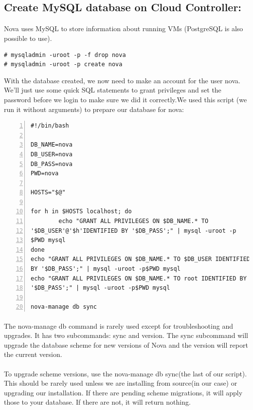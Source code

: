 \subsection{Create MySQL database on Cloud Controller:}
\paragraph{}Nova uses MySQL to store information about running VMs (PostgreSQL is also possible to use).


\begin{lstlisting}[language={[Latex]TeX}, frame=single]
# mysqladmin -uroot -p -f drop nova
# mysqladmin -uroot -p create nova
\end{lstlisting}
With the database created, we now need to make an account for the user nova. We’ll just use some quick SQL statements to grant privileges 
and set the password before we login to make sure we did it correctly.We used this script (we run it without arguments) to prepare our database for nova:

\begin{lstlisting}[language={[Latex]TeX}, numbers=left, frame=single]
#!/bin/bash

DB_NAME=nova
DB_USER=nova
DB_PASS=nova
PWD=nova

HOSTS="$@"

for h in $HOSTS localhost; do
        echo "GRANT ALL PRIVILEGES ON $DB_NAME.* TO 
'$DB_USER'@'$h'IDENTIFIED BY '$DB_PASS';" | mysql -uroot -p
$PWD mysql
done
echo "GRANT ALL PRIVILEGES ON $DB_NAME.* TO $DB_USER IDENTIFIED 
BY '$DB_PASS';" | mysql -uroot -p$PWD mysql
echo "GRANT ALL PRIVILEGES ON $DB_NAME.* TO root IDENTIFIED BY
'$DB_PASS';" | mysql -uroot -p$PWD mysql

nova-manage db sync

\end{lstlisting}
\paragraph{}The nova-manage db command is rarely used except for troubleshooting and upgrades. It has two subcommands: sync and version. 
The sync subcommand will upgrade the database scheme for new versions of Nova and the version will report the current version.\par

\paragraph{}To upgrade scheme versions, use the nova-manage db sync(the last of our script). 
This should be rarely used unless we are installing from source(in our case) or upgrading our installation. 
If there are pending scheme migrations, it will apply those to your database. If there are not, it will return nothing.\par
